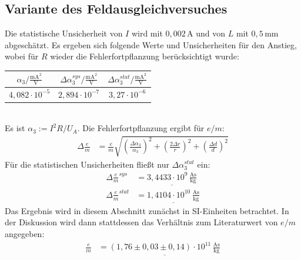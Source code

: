 \documentclass[a4paper,12pt]{article}
\newcommand{\kla}{}
\begin{document}
\subsection{Variante des Feldausgleichversuches}
Die statistische Unsicherheit von $I$ wird mit $0,002\,$A und von $L$ mit $0,5\,$mm abgeschätzt. Es ergeben sich folgende Werte und Unsicherheiten für den Anstieg, wobei für $R$ wieder die Fehlerfortpflanzung berücksichtigt wurde:
\begin{table}[h!]
\centering
\begin{tabular}{c|c|c}
$\alpha_3 / \frac{\mathrm{mA}^2}{\mathrm{V}}$ & $\Delta \alpha_3^{sys} / \frac{\mathrm{mA}^2}{\mathrm{V}}$ & $\Delta \alpha_3^{stat} / \frac{\mathrm{mA}^2}{\mathrm{V}}$ \\ \hline
$4,082\cdot 10^{-5}$&$2,894\cdot 10^{-7}$&$3,27\cdot 10^{-6}$\\
\end{tabular}
\end{table}\\
Es ist $\alpha_3:=I^2R/U_A$. Die Fehlerfortpflanzung ergibt für $e/m$:
\begin{align*}
\Delta\frac{e}{m}&=\frac{e}{m}\sqrt{\kla\left( {\frac{\Delta\alpha_3}{\alpha_3}} \right)^2+\kla\left( \frac{2\Delta r}{r} \right)^2+\kla\left( {\frac{\Delta d}{d}} \right)^2}
\end{align*}
Für die statistischen Unsicherheiten fließt nur $\Delta\alpha_3^{stat}$ ein:
\begin{align*}
\Delta\frac{e}{m}^{sys}&=\underline{3,4433\cdot 10^{9}\,\frac{\mathrm{As}}{\mathrm{kg}}}\\
\Delta\frac{e}{m}^{stat}&=\underline{1,4104\cdot 10^{10}\,\frac{\mathrm{As}}{\mathrm{kg}}}
\end{align*}
Das Ergebnis wird in diesem Abschnitt zunächst in SI-Einheiten betrachtet. In der Diskussion wird dann stattdessen das Verhältnis zum Literaturwert von $e/m$ angegeben:
\begin{align*}
\frac{e}{m}&=\underline{(1,76\pm 0,03\pm 0,14)\cdot 10^{11}\,\frac{\mathrm{As}}{\mathrm{kg}}}
\end{align*}
\end{document}
